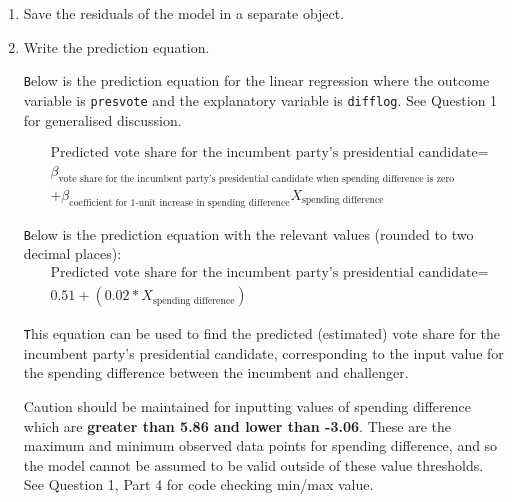 \documentclass[12pt,letterpaper]{article}
\begin{document}
\begin{enumerate}
		\item Save the residuals of the model in a separate object.
		
			
		
		\item Write the prediction equation.
		
			\texttt Below is the prediction equation for the linear regression where the outcome variable is \texttt{presvote} and the explanatory variable is \texttt{difflog}. See Question 1 for generalised discussion.
		
		\begin{align*}
			&\text{Predicted vote share for the incumbent party's presidential candidate} = \\ &\beta_\text{vote share for the incumbent party's presidential candidate when spending difference is zero} \\ &+ \beta_\text{coefficient for 1-unit increase in spending difference} X_\text{spending difference}
		\end{align*}
		
		\texttt Below is the prediction equation with the relevant values (rounded to two decimal places):
		\begin{align*}
			&\text{Predicted vote share for the incumbent party's presidential candidate} = \\ & 0.51 + (0.02 * X_\text{spending difference})
		\end{align*}
		
		\texttt This equation can be used to find the predicted (estimated) vote share for the incumbent party's presidential candidate, corresponding to the input value for the spending difference between the incumbent and challenger.
		
		Caution should be maintained for inputting values of spending difference which are \textbf{greater than 5.86 and lower than -3.06}. These are the maximum and minimum observed data points for spending difference, and so the model cannot be assumed to be valid outside of these value thresholds. See Question 1, Part 4 for code checking min/max value.
		
	\end{enumerate}
	
\newpage	
\end{document}
